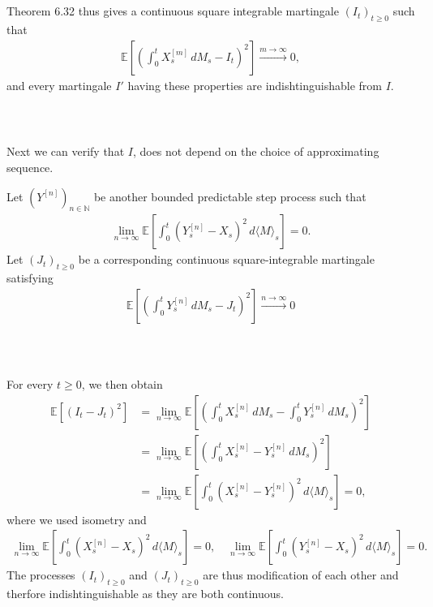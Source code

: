 \documentclass{beamer}
\numberwithin{equation}{section}
\newenvironment{frame2}{\begin{frame}\frametitle{{\normalsize \secname} \\ {\large \subsecname}}}{\end{frame}}
\begin{document}
\begin{frame2}
    Theorem 6.32 thus gives a continuous square integrable martingale $(I_t)_{t\geq 0}$ such that
    \begin{align}
        \mathbb{E}\left[\left(\int_0^t X_s^{[m]}\, dM_s - I_t\right)^2\right] \xrightarrow{m\to\infty}0,
    \end{align}
    and every martingale $I'$ having these properties are indishtinguishable from $I$.
\end{frame2}

\begin{frame2}
    Next we can verify that $I$, does not depend on the choice of approximating sequence.

    \vspace{10pt}
    Let $(Y^{[n]})_{n \in \mathbb{N}}$ be another bounded predictable step process such that
    \begin{align}
        \lim_{n\to\infty}\mathbb{E}\left[\int_0^t \left(Y_s^{[n]} - X_s\right)^2 \, d\langle M \rangle_s\right] = 0.
    \end{align}
    Let $(J_t)_{t\geq 0}$ be a corresponding continuous square-integrable martingale satisfying
    \begin{align}
        \mathbb{E}\left[\left(\int_0^t Y_s^{[n]}\, dM_s - J_t\right)^2\right] \xrightarrow{n\to\infty}0
    \end{align}
\end{frame2}

\begin{frame2}
    For every $t\geq 0$, we then obtain
    \begin{align*}
        \mathbb{E}\left[(I_t - J_t)^2\right] &= \lim_{n\to\infty}\mathbb{E}\left[\left(\int_0^t X_s^{[n]}\, dM_s - \int_0^tY^{[n]}_s \, dM_s\right)^2\right] \\
        &=\lim_{n\to\infty}\mathbb{E}\left[\left(\int_0^t X_s^{[n]} - Y^{[n]}_s \, dM_s\right)^2\right] \\
        &=\lim_{n\to\infty}\mathbb{E}\left[\int_0^t\left( X_s^{[n]} - Y^{[n]}_s\right)^2 \, d\langle M \rangle_s\right] = 0,
    \end{align*}
    where we used isometry and
    \begingroup
    \footnotesize
    \begin{align*}
        \lim_{n \to \infty} \mathbb{E}\left[\int_0^t (X_s^{[n]} - X_s)^2 \, d\langle M \rangle_s\right] = 0, \quad
        \lim_{n\to\infty}\mathbb{E}\left[\int_0^t \left(Y_s^{[n]} - X_s\right)^2 \, d\langle M \rangle_s\right] = 0.
    \end{align*}
    \endgroup
    The processes $(I_t)_{t\geq 0}$ and $(J_t)_{t\geq 0}$ are thus modification of each other and therfore indishtinguishable as they are both continuous.
\end{frame2}
\end{document}
